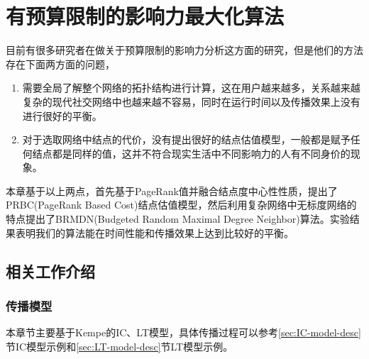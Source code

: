 

\chapter{有预算限制的影响力最大化算法}
\label{cha:3thChap03}


目前有很多研究者在做关于预算限制的影响力分析这方面的研究，但是他们的方法存在下面两方面的问题，
\begin{enumerate}
\item 需要全局了解整个网络的拓扑结构进行计算，这在用户越来越多，关系越来越复杂的现代社交网络中也越来越不容易，同时在运行时间以及传播效果上没有进行很好的平衡。
\item 对于选取网络中结点的代价，没有提出很好的结点估值模型，一般都是赋予任何结点都是同样的值，这并不符合现实生活中不同影响力的人有不同身价的现象。
\end{enumerate}
本章基于以上两点，首先基于PageRank值并融合结点度中心性性质，提出了PRBC(PageRank Based Cost)结点估值模型，然后利用复杂网络中无标度网络的特点提出了BRMDN(Budgeted Random Maximal Degree Neighbor)算法。实验结果表明我们的算法能在时间性能和传播效果上达到比较好的平衡。


\section{相关工作介绍}
\subsection{传播模型}
本章节主要基于Kempe\cite{kempe2003maximizing}的IC、LT模型，具体传播过程可以参考\ref{sec:IC-model-desc}节IC模型示例和\ref{sec:LT-model-desc}节LT模型示例。




